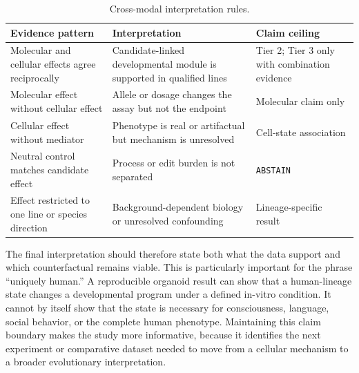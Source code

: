 \documentclass[conference]{IEEEtran}
\newcommand{\abstain}{\texttt{ABSTAIN}}
\begin{document}
\begin{table}[t]
\caption{Cross-modal interpretation rules.}
\label{tab:concordance}
\centering
\scriptsize
\renewcommand{\arraystretch}{1.08}
\begin{tabular}{|p{}|p{}|p{}|}
\hline
\textbf{Evidence pattern} & \textbf{Interpretation} & \textbf{Claim ceiling} \\
\hline
Molecular and cellular effects agree reciprocally & Candidate-linked developmental module is supported in qualified lines & Tier 2; Tier 3 only with combination evidence \\
\hline
Molecular effect without cellular effect & Allele or dosage changes the assay but not the endpoint & Molecular claim only \\
\hline
Cellular effect without mediator & Phenotype is real or artifactual but mechanism is unresolved & Cell-state association \\
\hline
Neutral control matches candidate effect & Process or edit burden is not separated & \abstain{} \\
\hline
Effect restricted to one line or species direction & Background-dependent biology or unresolved confounding & Lineage-specific result \\
\hline
\end{tabular}
\end{table}

The final interpretation should therefore state both what the data support and which counterfactual remains viable. This is particularly important for the phrase ``uniquely human.'' A reproducible organoid result can show that a human-lineage state changes a developmental program under a defined in-vitro condition. It cannot by itself show that the state is necessary for consciousness, language, social behavior, or the complete human phenotype. Maintaining this claim boundary makes the study more informative, because it identifies the next experiment or comparative dataset needed to move from a cellular mechanism to a broader evolutionary interpretation.
\end{document}
